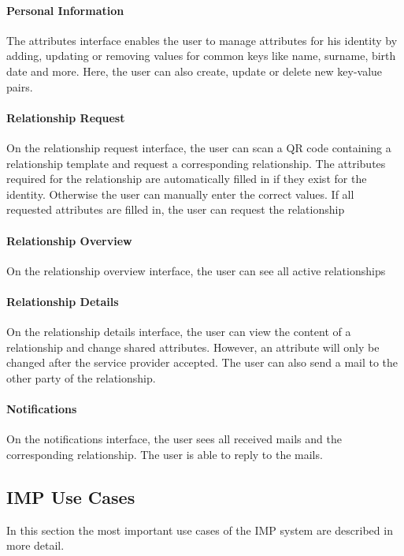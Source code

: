 \paragraph{Personal Information} The attributes interface enables the user to manage attributes for his identity by adding, updating or removing values for common keys like name, surname, birth date and more. Here, the user can also create, update or delete new key-value pairs.

\paragraph{Relationship Request} On the relationship request interface, the user can scan a QR code containing a relationship template and request a corresponding relationship. The attributes required for the relationship are automatically filled in if they exist for the identity. Otherwise the user can manually enter the correct values. If all requested attributes are filled in, the user can request the relationship

\paragraph{Relationship Overview} On the relationship overview interface, the user can see all active relationships

\paragraph{Relationship Details} On the relationship details interface, the user can view the content of a relationship and change shared attributes. However, an attribute will only be changed after the service provider accepted. The user can also send a mail to the other party of the relationship.

\paragraph{Notifications} On the notifications interface, the user sees all received mails and the corresponding relationship. The user is able to reply to the mails.

\subsection{IMP Use Cases}

In this section the most important use cases of the IMP system are described in more detail.

